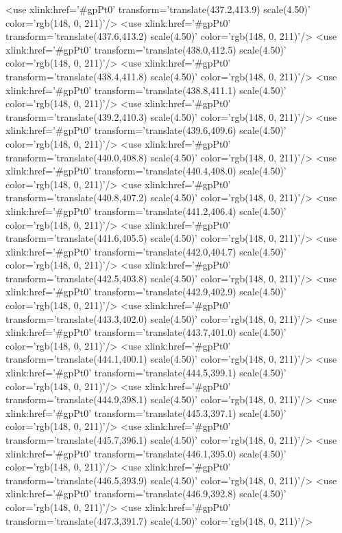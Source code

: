 	<use xlink:href='#gpPt0' transform='translate(437.2,413.9) scale(4.50)' color='rgb(148,   0, 211)'/>
	<use xlink:href='#gpPt0' transform='translate(437.6,413.2) scale(4.50)' color='rgb(148,   0, 211)'/>
	<use xlink:href='#gpPt0' transform='translate(438.0,412.5) scale(4.50)' color='rgb(148,   0, 211)'/>
	<use xlink:href='#gpPt0' transform='translate(438.4,411.8) scale(4.50)' color='rgb(148,   0, 211)'/>
	<use xlink:href='#gpPt0' transform='translate(438.8,411.1) scale(4.50)' color='rgb(148,   0, 211)'/>
	<use xlink:href='#gpPt0' transform='translate(439.2,410.3) scale(4.50)' color='rgb(148,   0, 211)'/>
	<use xlink:href='#gpPt0' transform='translate(439.6,409.6) scale(4.50)' color='rgb(148,   0, 211)'/>
	<use xlink:href='#gpPt0' transform='translate(440.0,408.8) scale(4.50)' color='rgb(148,   0, 211)'/>
	<use xlink:href='#gpPt0' transform='translate(440.4,408.0) scale(4.50)' color='rgb(148,   0, 211)'/>
	<use xlink:href='#gpPt0' transform='translate(440.8,407.2) scale(4.50)' color='rgb(148,   0, 211)'/>
	<use xlink:href='#gpPt0' transform='translate(441.2,406.4) scale(4.50)' color='rgb(148,   0, 211)'/>
	<use xlink:href='#gpPt0' transform='translate(441.6,405.5) scale(4.50)' color='rgb(148,   0, 211)'/>
	<use xlink:href='#gpPt0' transform='translate(442.0,404.7) scale(4.50)' color='rgb(148,   0, 211)'/>
	<use xlink:href='#gpPt0' transform='translate(442.5,403.8) scale(4.50)' color='rgb(148,   0, 211)'/>
	<use xlink:href='#gpPt0' transform='translate(442.9,402.9) scale(4.50)' color='rgb(148,   0, 211)'/>
	<use xlink:href='#gpPt0' transform='translate(443.3,402.0) scale(4.50)' color='rgb(148,   0, 211)'/>
	<use xlink:href='#gpPt0' transform='translate(443.7,401.0) scale(4.50)' color='rgb(148,   0, 211)'/>
	<use xlink:href='#gpPt0' transform='translate(444.1,400.1) scale(4.50)' color='rgb(148,   0, 211)'/>
	<use xlink:href='#gpPt0' transform='translate(444.5,399.1) scale(4.50)' color='rgb(148,   0, 211)'/>
	<use xlink:href='#gpPt0' transform='translate(444.9,398.1) scale(4.50)' color='rgb(148,   0, 211)'/>
	<use xlink:href='#gpPt0' transform='translate(445.3,397.1) scale(4.50)' color='rgb(148,   0, 211)'/>
	<use xlink:href='#gpPt0' transform='translate(445.7,396.1) scale(4.50)' color='rgb(148,   0, 211)'/>
	<use xlink:href='#gpPt0' transform='translate(446.1,395.0) scale(4.50)' color='rgb(148,   0, 211)'/>
	<use xlink:href='#gpPt0' transform='translate(446.5,393.9) scale(4.50)' color='rgb(148,   0, 211)'/>
	<use xlink:href='#gpPt0' transform='translate(446.9,392.8) scale(4.50)' color='rgb(148,   0, 211)'/>
	<use xlink:href='#gpPt0' transform='translate(447.3,391.7) scale(4.50)' color='rgb(148,   0, 211)'/>
